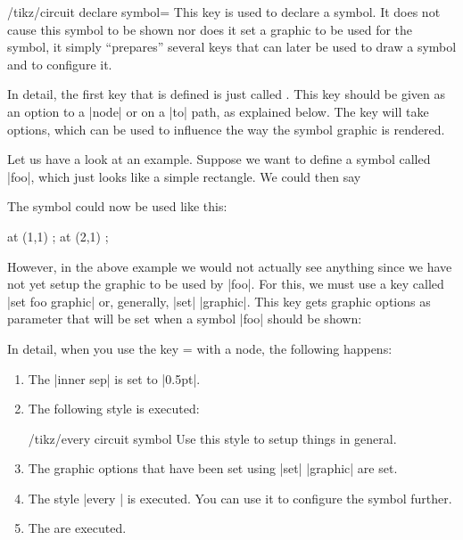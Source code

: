 \begin{key}{/tikz/circuit declare symbol=}
  This key is used to declare a symbol. It does not cause this symbol
  to be shown nor does it set a graphic to be used for the symbol, it
  simply ``prepares'' several keys that can later be used to draw a
  symbol and to configure it.

  In detail, the first key that is defined is just called
  . This key should be given as an option to a |node| or on
  a |to| path, as explained below. The key will take options, which
  can be used to influence the way the symbol graphic is rendered.

  Let us have a look at an example. Suppose we want to define a symbol
  called |foo|, which just looks like a simple rectangle. We could
  then say
\begin{codeexample}
\tikzset{circuit declare symbol=foo}
\end{codeexample}
  The symbol could now be used like this:
\begin{codeexample}
  \node [foo]       at (1,1) {};
  \node [foo={red}] at (2,1) {};
\end{codeexample}

  However, in the above example we would not actually see anything
  since we have not yet setup the graphic to be used by |foo|. For
  this, we must use a key called |set foo graphic| or, generally,
  |set|  |graphic|. This key gets graphic options as parameter
  that will be set when a symbol |foo| should be shown:
\begin{codeexample}[]
\end{codeexample}

  In detail, when you use the key = with a
  node, the following happens:
  \begin{enumerate}
  \item The |inner sep| is set to |0.5pt|.
  \item The following style is executed:
    \begin{stylekey}{/tikz/every circuit symbol}
      Use this style to setup things in general.
    \end{stylekey}
  \item The graphic options that have been set using
    |set|  |graphic| are set.
  \item The style |every | is executed. You can use it to
    configure the symbol further.
  \item The  are executed.
  \end{enumerate}


\end{key}
